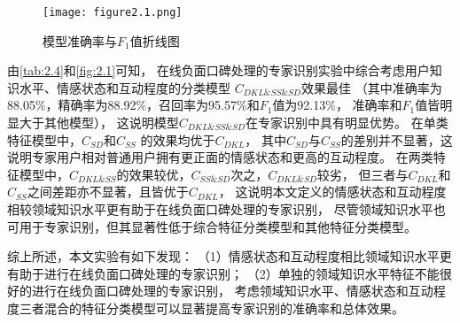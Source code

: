 \begin{figure}[th]
    
    \centering
    \texttt{[image: figure2.1.png]}
    \vskip -10pt
    \caption{模型准确率与$F_1$值折线图}\label{fig:2.1}
\end{figure}

由\autoref{tab:2.4}和\autoref{fig:2.1}可知，
在线负面口碑处理的专家识别实验中综合考虑用户知识水平、情感状态和互动程度的分类模型
$C_{DKL \& SS \& SD}$效果最佳
（其中准确率为88.05\%，精确率为88.92\%，召回率为95.57\%和$F_1$值为92.13\%，
准确率和$F_1$值皆明显大于其他模型），
这说明模型$C_{DKL \& SS \& SD}$在专家识别中具有明显优势。
在单类特征模型中，$C_{SD}$和$C_{SS}$ 的效果均优于$C_{DKL}$，
其中$C_{SD}$与$C_{SS}$的差别并不显著，这说明专家用户相对普通用户拥有更正面的情感状态和更高的互动程度。
在两类特征模型中，$C_{DKL \& SS}$的效果较优，$C_{SS \& SD}$次之，$C_{DKL \& SD}$较劣，
但三者与$C_{DKL}$和$C_{SS}$之间差距亦不显著，且皆优于$C_{DKL}$，
这说明本文定义的情感状态和互动程度相较领域知识水平更有助于在线负面口碑处理的专家识别，
尽管领域知识水平也可用于专家识别，但其显著性低于综合特征分类模型和其他特征分类模型。

综上所述，本文实验有如下发现：
（1）情感状态和互动程度相比领域知识水平更有助于进行在线负面口碑处理的专家识别；
（2）单独的领域知识水平特征不能很好的进行在线负面口碑处理的专家识别，
考虑领域知识水平、情感状态和互动程度三者混合的特征分类模型可以显著提高专家识别的准确率和总体效果。
